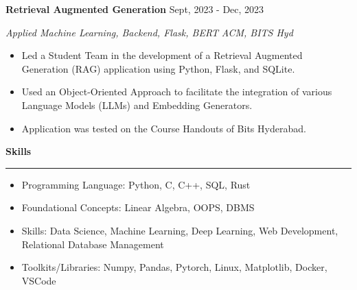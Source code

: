 \documentclass[a4paper,12pt]{report}
\begin{document}
\noindent 
\textbf{Retrieval Augmented Generation} \hfill  {\fontsize{12pt}{12pt}\selectfont Sept, 2023 - Dec, 2023} \par
\noindent
{\fontsize{12pt}{12pt}\selectfont \textit{Applied Machine Learning, Backend, Flask, BERT}\hfill\textit{ ACM, BITS Hyd}} \par
\noindent 
\begin{itemize}[noitemsep,topsep=0pt]
    \item {\fontsize{12pt}{12pt}\selectfont Led a Student Team in the development of a Retrieval Augmented Generation (RAG) application using Python, Flask, and SQLite. } \par
    \item {\fontsize{12pt}{12pt}\selectfont Used an Object-Oriented Approach to facilitate the integration of various Language Models (LLMs) and Embedding Generators. } \par
    \item {\fontsize{12pt}{12pt}\selectfont Application was tested on the Course Handouts of Bits Hyderabad.} \par
\end{itemize}

 \par
\vspace{9pt}


\noindent 
\textbf{Skills} \par
\vspace{2pt}
\hrule
\vspace{6pt}
\noindent 
\begin{itemize}[noitemsep,topsep=0pt]
\item {\fontsize{12pt}{12pt}\selectfont Programming Language:}  Python, C, C++, SQL, Rust \par
\noindent 
\item {\fontsize{12pt}{12pt}\selectfont Foundational Concepts:} Linear Algebra, OOPS, DBMS \par
\noindent 
\item {\fontsize{12pt}{12pt}\selectfont Skills:} Data Science, Machine Learning, Deep Learning, Web Development, Relational Database Management \par
\noindent 
\item {\fontsize{12pt}{12pt}\selectfont Toolkits/Libraries:} Numpy, Pandas, Pytorch, Linux, Matplotlib, Docker, VSCode \par
\end{itemize}
\end{document}
